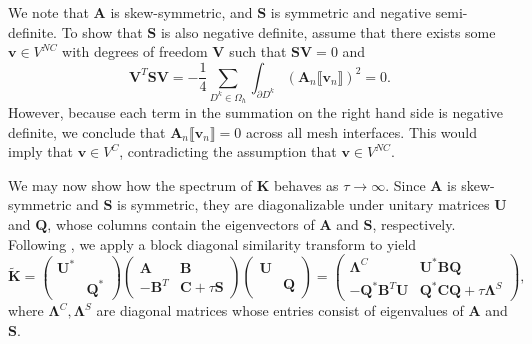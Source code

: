 \documentclass[preprint,10pt]{elsarticle}
\newcommand{\LRp}[1]{\left( #1 \right)}
\newcommand{\LRa}[1]{\left\langle #1 \right\rangle}
\newcommand{\jump}[1] {\ensuremath{\llbracket#1\rrbracket}}
\newcommand{\Gh}{\Gamma_h}
\newcommand{\Oh}{\Omega_h}
\newcommand{\note}[1]{#1}
\begin{document}
\note{We note that $\bm{A}$ is skew-symmetric, and $\bm{S}$ is symmetric and negative semi-definite.  To show that $\bm{S}$ is also negative definite, assume that there exists some $\bm{v} \in V^{NC}$ with degrees of freedom $\bm{V}$ such that $\bm{S}\bm{V} = 0$ and
\[
\bm{V}^T\bm{S}\bm{V} = -\frac{1}{4}\sum_{D^k \in \Oh} \int_{\partial D^k} \LRp{\bm{A}_n\jump{ \bm{v}_n}}^2 = 0.
\]
However, because each term in the summation on the right hand side is negative definite, we conclude that $\bm{A}_n\jump{ \bm{v}_n} = 0$ across all mesh interfaces.  This would imply that $\bm{v}\in V^C$, contradicting the assumption that $\bm{v} \in V^{NC}$.}  %

We may now show how the \note{spectrum} of $\bm{K}$ behaves as $\tau \rightarrow \infty$.  Since $\bm{A}$ is skew-symmetric and $\bm{S}$ is symmetric, they are diagonalizable under unitary matrices $\bm{U}$ and $\bm{Q}$, whose columns contain the eigenvectors of $\bm{A}$ and $\bm{S}$, respectively.   
Following \cite{Warburton20063205}, we apply a block diagonal similarity transform to yield
\[
\tilde{\bm{K}} = \left(\begin{array}{cc}
\bm{U}^* & \\
& \bm{Q}^*
\end{array}\right)
\left(\begin{array}{cc}
\bm{A} & \bm{B}\\
-\bm{B}^T & \bm{C} + \tau \bm{S}
\end{array}\right)
\left(\begin{array}{cc}
\bm{U} & \\
& \bm{Q}
\end{array}\right)
 = \left(\begin{array}{cc}
\bm{\Lambda}^C & \bm{U}^*\bm{B}\bm{Q}\\
-\bm{Q}^*\bm{B}^T\bm{U} & \bm{Q}^*\bm{C}\bm{Q} + \tau \bm{\Lambda}^{S}
\end{array}\right),
\]
where $\bm{\Lambda}^C,\bm{\Lambda}^{S}$ are diagonal matrices whose entries consist of eigenvalues of $\bm{A}$ and $\bm{S}$.  
\end{document}
